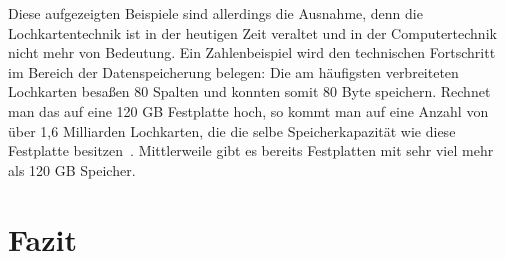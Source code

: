 \documentclass[parskip=half]{scrartcl}
\begin{document}
Diese aufgezeigten Beispiele sind allerdings die Ausnahme, denn die
Lochkartentechnik ist in der heutigen Zeit veraltet und in der Computertechnik
nicht mehr von Bedeutung. Ein Zahlenbeispiel wird den technischen Fortschritt
im Bereich der Datenspeicherung belegen: Die am häufigsten verbreiteten
Lochkarten besaßen 80 Spalten und konnten somit 80 Byte speichern. Rechnet man
das auf eine 120 GB Festplatte hoch, so kommt man auf eine Anzahl von über 1,6
Milliarden Lochkarten, die die selbe Speicherkapazität wie diese Festplatte
besitzen~\cite{roeltgen}. Mittlerweile gibt es bereits Festplatten mit sehr
viel mehr als 120 GB Speicher.

\section{Fazit}

\printbibliography
\end{document}
